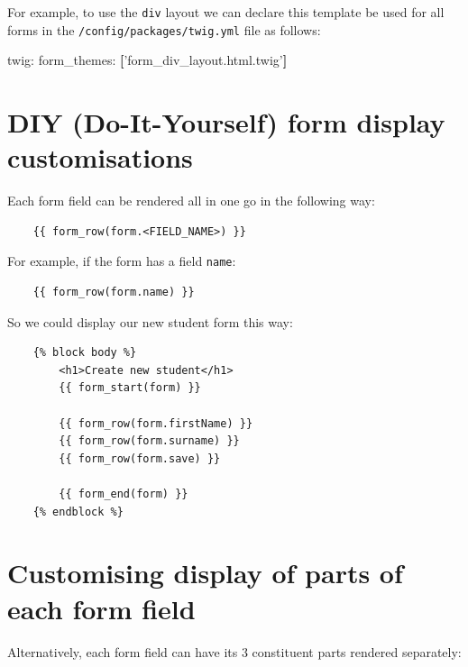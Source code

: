 \documentclass[a4paperpaper,openright]{book}
\newenvironment{Shaded}{}{}
\newcommand{\AttributeTok}[1]{\textcolor[rgb]{0.49,0.56,0.16}{#1}}
\newcommand{\FunctionTok}[1]{\textcolor[rgb]{0.02,0.16,0.49}{#1}}
\newcommand{\KeywordTok}[1]{\textcolor[rgb]{0.00,0.44,0.13}{\textbf{#1}}}
\newcommand{\StringTok}[1]{\textcolor[rgb]{0.25,0.44,0.63}{#1}}
\begin{document}
For example, to use the \texttt{div} layout we can declare this template
be used for all forms in the \texttt{/config/packages/twig.yml} file as
follows:

\begin{Shaded}
\begin{Highlighting}[]
    \FunctionTok{twig:}
        \FunctionTok{form_themes:}\AttributeTok{ }\KeywordTok{[}\StringTok{'form_div_layout.html.twig'}\KeywordTok{]}
\end{Highlighting}
\end{Shaded}

\hypertarget{diy-do-it-yourself-form-display-customisations}{%
\section{DIY (Do-It-Yourself) form display
customisations}\label{diy-do-it-yourself-form-display-customisations}}

Each form field can be rendered all in one go in the following way:

\begin{verbatim}
    {{ form_row(form.<FIELD_NAME>) }}
\end{verbatim}

For example, if the form has a field \texttt{name}:

\begin{verbatim}
    {{ form_row(form.name) }}
\end{verbatim}

So we could display our new student form this way:

\begin{verbatim}
    {% block body %}
        <h1>Create new student</h1>
        {{ form_start(form) }}

        {{ form_row(form.firstName) }}
        {{ form_row(form.surname) }}
        {{ form_row(form.save) }}

        {{ form_end(form) }}
    {% endblock %}
\end{verbatim}

\hypertarget{customising-display-of-parts-of-each-form-field}{%
\section{Customising display of parts of each form
field}\label{customising-display-of-parts-of-each-form-field}}

Alternatively, each form field can have its 3 constituent parts rendered
separately:
\end{document}
